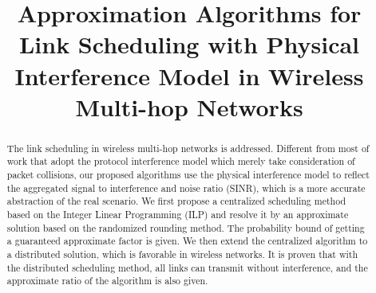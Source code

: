 \documentclass[conference]{IEEEtran}
\begin{document}
\title{Approximation Algorithms for Link Scheduling with Physical Interference Model in Wireless Multi-hop Networks}







\author{
 \and {}
 \and {}
}













\maketitle


\begin{abstract}
The link scheduling in wireless multi-hop networks is addressed.
Different from most of work that adopt the protocol interference
model which merely take consideration of packet collisions, our
proposed algorithms use the physical interference model to reflect
the aggregated signal to interference and noise ratio (SINR), which
is a more accurate abstraction of the real scenario. We first
propose a centralized scheduling method based on the Integer Linear
Programming (ILP) and resolve it by an approximate solution based on
the randomized rounding method. The probability bound of getting a
guaranteed approximate factor is given. We then extend the
centralized algorithm to a distributed solution, which is favorable
in wireless networks. It is proven that with the distributed
scheduling method, all links can transmit without interference, and
the approximate ratio of the algorithm is also given.
\end{abstract}
\end{document}

